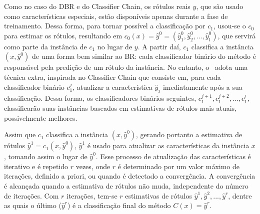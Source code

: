  Como no caso do DBR e do Classifier Chain, os rótulos reais $y$, que são usado como características especiais,
 estão disponíveis apenas durante a fase de treinamento. Dessa forma, para tornar possível a classificação por $c_1$, usou-se o $c_0$ para
 estimar os rótulos, %
 resultando em $c_0(x)=\hat{y}^0=(\hat{y}_1^0,\hat{y}_2^0,...,\hat{y}_l^0)$, que servirá como parte da instância de $c_1$
 no lugar de $y$. 
 A partir daí, $c_1$ classifica a instância $(x,\hat{y}^0)$ de uma forma bem similar ao BR:
 cada classificador binário do método é responsável pela predição de um rótulo da instância.
 No entanto, o \MRLMa~adota uma técnica extra, inspirada no Classifier Chain que consiste em, para
 cada classificador binário $c_1^j$, atualizar a característica $\hat{y}_j$ imediatamente após 
 a sua classificação. Dessa forma, os classificadores binários seguintes, $c_1^{j+1},c_1^{j+2},...,c_1^{l}$,
 classificarão suas instâncias baseados em estimativas de rótulos mais atuais, possivelmente melhores.

 Assim que $c_1$ classifica a instância $(x,\hat{y}^0)$, gerando portanto a estimativa de rótulos $\hat{y}^1=c_1(x,\hat{y}^0)$,
 $\hat{y}^1$ é usado para atualizar as características da instância $x$, tomando assim o lugar de $\hat{y}^0$.
 Esse processo de atualização das características é iterativo e é repetido $r$ vezes,
 onde $r$ é determinado por um valor máximo de iterações, definido a priori, ou quando é detectado a convergência.
 A convergência é alcançada quando a estimativa de rótulos não muda, independente do número de iterações.
 Com $r$ iterações, tem-se $r$ estimativas de rótulos $\hat{y}^1,\hat{y}^2,...,\hat{y}^r$, dentre as quais o último ($\hat{y}^r$)
 é a classificação final do método $C(x)=\hat{y}^r$.
 
